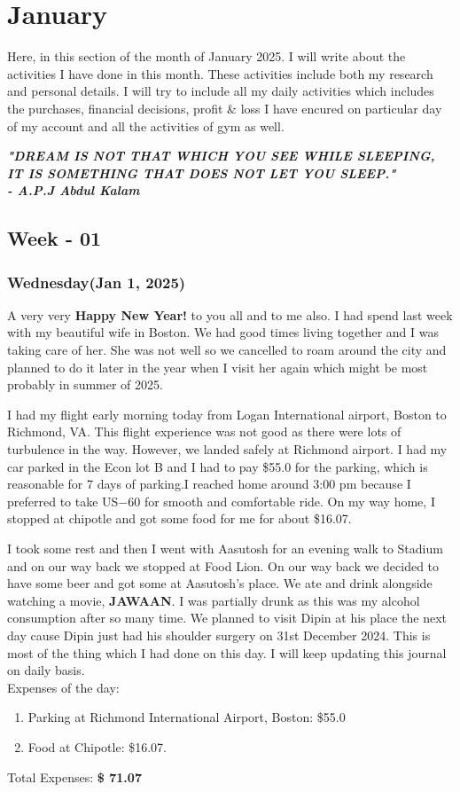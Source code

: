 \chapter{January}

Here, in this section of the month of January 2025. I will write about the activities I have done in this month. These activities include both my research and personal details. I will try to include all my daily activities which includes the purchases, financial decisions, profit \& loss I have encured on particular day of my account and all the activities of gym as well.\cite{zhou2015}

\begin{displayquote}
    \textbf{\emph{"DREAM IS NOT THAT WHICH YOU SEE WHILE SLEEPING, IT IS SOMETHING THAT DOES NOT LET YOU SLEEP."\\- A.P.J Abdul Kalam}}
\end{displayquote}
\section{Week - 01}
\subsection*{Wednesday(Jan 1, 2025)}A very very \textbf{Happy New Year!} to you all and to me also. I had spend last week with my beautiful wife in Boston. We had good times living together and I was taking care of her. She was not well so we cancelled to roam around the city and planned to do it later in the year when I visit her again which might be most probably in summer of 2025. 

I had my flight early morning today from Logan International airport, Boston to Richmond, VA. This flight experience was not good as there were lots of turbulence in the way. However, we landed safely at Richmond airport. I had my car parked in the Econ lot B and I had to pay \$55.0 for the parking, which is reasonable for 7 days of parking.I reached home around 3:00 pm because I preferred to take US$-60$ for smooth and comfortable ride. On my way home, I stopped at chipotle and got some food for me for about \$16.07. 

I took some rest and then I went with Aasutosh for an evening walk to Stadium and on our way back we stopped at Food Lion. On our way back we decided to have some beer and got some at Aasutosh's place. We ate and drink alongside watching a movie, \textbf{JAWAAN}. I was partially drunk as this was my alcohol consumption after so many time. We planned to visit Dipin at his place the next day cause Dipin just had his shoulder surgery on 31st December 2024. This is most of the thing which I had done on this day. I will keep updating this journal on daily basis.\\
Expenses of the day:
\begin{enumerate}
    \item Parking at Richmond International Airport, Boston: \$55.0
    \item Food at Chipotle: \$16.07.
\end{enumerate}
Total Expenses: \textbf{\$ 71.07}
